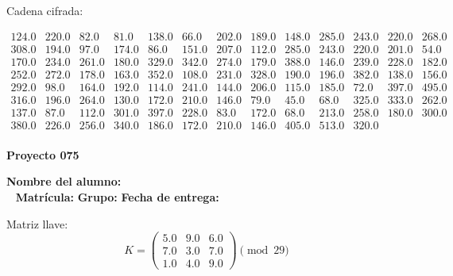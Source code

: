 \documentclass[12pt]{article}
\begin{document}
Cadena cifrada:
\begin{center}
$\begin{array}{lllllllllllll}
124.0 & 220.0 & 82.0 & 81.0 & 138.0 & 66.0 & 202.0 & 189.0 & 148.0 & 285.0 & 243.0 & 220.0 & 268.0\\
308.0 & 194.0 & 97.0 & 174.0 & 86.0 & 151.0 & 207.0 & 112.0 & 285.0 & 243.0 & 220.0 & 201.0 & 54.0\\
170.0 & 234.0 & 261.0 & 180.0 & 329.0 & 342.0 & 274.0 & 179.0 & 388.0 & 146.0 & 239.0 & 228.0 & 182.0\\
252.0 & 272.0 & 178.0 & 163.0 & 352.0 & 108.0 & 231.0 & 328.0 & 190.0 & 196.0 & 382.0 & 138.0 & 156.0\\
292.0 & 98.0 & 164.0 & 192.0 & 114.0 & 241.0 & 144.0 & 206.0 & 115.0 & 185.0 & 72.0 & 397.0 & 495.0\\
316.0 & 196.0 & 264.0 & 130.0 & 172.0 & 210.0 & 146.0 & 79.0 & 45.0 & 68.0 & 325.0 & 333.0 & 262.0\\
137.0 & 87.0 & 112.0 & 301.0 & 397.0 & 228.0 & 83.0 & 172.0 & 68.0 & 213.0 & 258.0 & 180.0 & 300.0\\
380.0 & 226.0 & 256.0 & 340.0 & 186.0 & 172.0 & 210.0 & 146.0 & 405.0 & 513.0 & 320.0\\
\end{array}$
\end{center}

\newpage


\textbf{Proyecto 075}

\textbf{Nombre del alumno:} \underline{\hspace{13cm}}\\\
\vspace{1cm}
\textbf{Matrícula:} \underline{\hspace{4cm}} \hspace{1cm}
\textbf{Grupo:} \underline{\hspace{2cm}}
\textbf{Fecha de entrega:} \underline{\hspace{2cm}}

\medskip

Matriz llave:
\[
K = \begin{pmatrix}
5.0 & 9.0 & 6.0\\
7.0 & 3.0 & 7.0\\
1.0 & 4.0 & 9.0
\end{pmatrix} \pmod{29}
\]
\end{document}
